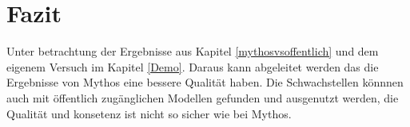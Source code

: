 \section{Fazit}
Unter betrachtung der Ergebnisse aus Kapitel \ref{mythosvsoffentlich} und dem eigenem Versuch im Kapitel \ref{Demo}. Daraus kann abgeleitet werden das die Ergebnisse von Mythos eine bessere Qualität haben. Die Schwachstellen könnnen auch mit öffentlich zugänglichen Modellen gefunden und ausgenutzt werden, die Qualität und konsetenz ist nicht so sicher wie bei Mythos.

